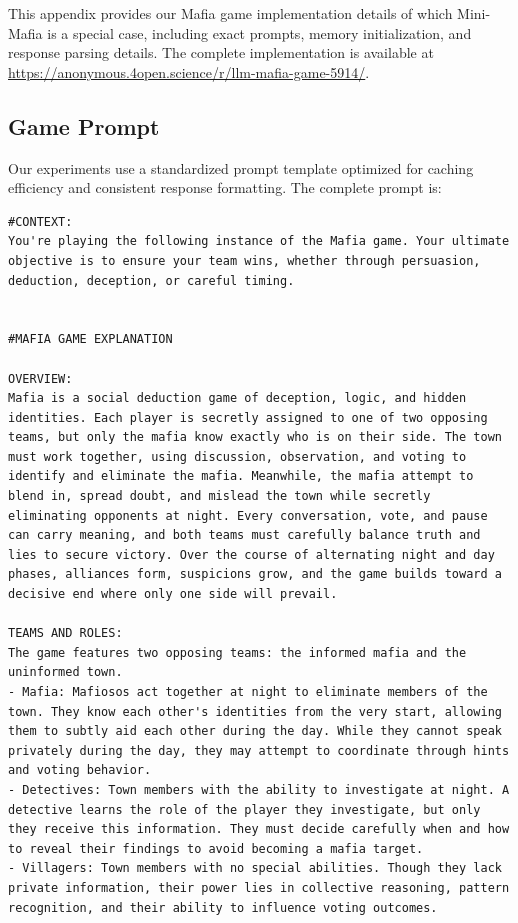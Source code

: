 \documentclass{article}
\begin{document}
This appendix provides our Mafia game implementation details of which Mini-Mafia is a special case, including exact prompts, memory initialization, and response parsing details. The complete implementation is available at \url{https://anonymous.4open.science/r/llm-mafia-game-5914/}.

\subsection{Game Prompt}

Our experiments use a standardized prompt template optimized for caching efficiency and consistent response formatting. The complete prompt is:

\begin{small}
\begin{verbatim}
#CONTEXT:
You're playing the following instance of the Mafia game. Your ultimate objective is to ensure your team wins, whether through persuasion, deduction, deception, or careful timing.


#MAFIA GAME EXPLANATION

OVERVIEW:
Mafia is a social deduction game of deception, logic, and hidden identities. Each player is secretly assigned to one of two opposing teams, but only the mafia know exactly who is on their side. The town must work together, using discussion, observation, and voting to identify and eliminate the mafia. Meanwhile, the mafia attempt to blend in, spread doubt, and mislead the town while secretly eliminating opponents at night. Every conversation, vote, and pause can carry meaning, and both teams must carefully balance truth and lies to secure victory. Over the course of alternating night and day phases, alliances form, suspicions grow, and the game builds toward a decisive end where only one side will prevail.

TEAMS AND ROLES:
The game features two opposing teams: the informed mafia and the uninformed town.
- Mafia: Mafiosos act together at night to eliminate members of the town. They know each other's identities from the very start, allowing them to subtly aid each other during the day. While they cannot speak privately during the day, they may attempt to coordinate through hints and voting behavior.
- Detectives: Town members with the ability to investigate at night. A detective learns the role of the player they investigate, but only they receive this information. They must decide carefully when and how to reveal their findings to avoid becoming a mafia target.
- Villagers: Town members with no special abilities. Though they lack private information, their power lies in collective reasoning, pattern recognition, and their ability to influence voting outcomes.


\end{verbatim}
\end{small}
\end{document}
